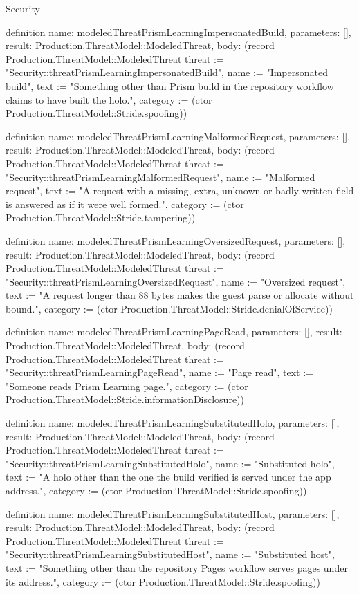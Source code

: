 \begin{lexlean}{Security}
\begin{semanticmodule}
definition{
  name: modeledThreatPrismLearningImpersonatedBuild,
  parameters: [],
  result: Production.ThreatModel::ModeledThreat,
  body: (record Production.ThreatModel::ModeledThreat {threat := "Security::threatPrismLearningImpersonatedBuild", name := "Impersonated build", text := "Something other than Prism build in the repository workflow claims to have built the holo.", category := (ctor Production.ThreatModel::Stride.spoofing)})
}

definition{
  name: modeledThreatPrismLearningMalformedRequest,
  parameters: [],
  result: Production.ThreatModel::ModeledThreat,
  body: (record Production.ThreatModel::ModeledThreat {threat := "Security::threatPrismLearningMalformedRequest", name := "Malformed request", text := "A request with a missing, extra, unknown or badly written field is answered as if it were well formed.", category := (ctor Production.ThreatModel::Stride.tampering)})
}

definition{
  name: modeledThreatPrismLearningOversizedRequest,
  parameters: [],
  result: Production.ThreatModel::ModeledThreat,
  body: (record Production.ThreatModel::ModeledThreat {threat := "Security::threatPrismLearningOversizedRequest", name := "Oversized request", text := "A request longer than 88 bytes makes the guest parse or allocate without bound.", category := (ctor Production.ThreatModel::Stride.denialOfService)})
}

definition{
  name: modeledThreatPrismLearningPageRead,
  parameters: [],
  result: Production.ThreatModel::ModeledThreat,
  body: (record Production.ThreatModel::ModeledThreat {threat := "Security::threatPrismLearningPageRead", name := "Page read", text := "Someone reads Prism Learning page.", category := (ctor Production.ThreatModel::Stride.informationDisclosure)})
}

definition{
  name: modeledThreatPrismLearningSubstitutedHolo,
  parameters: [],
  result: Production.ThreatModel::ModeledThreat,
  body: (record Production.ThreatModel::ModeledThreat {threat := "Security::threatPrismLearningSubstitutedHolo", name := "Substituted holo", text := "A holo other than the one the build verified is served under the app address.", category := (ctor Production.ThreatModel::Stride.spoofing)})
}

definition{
  name: modeledThreatPrismLearningSubstitutedHost,
  parameters: [],
  result: Production.ThreatModel::ModeledThreat,
  body: (record Production.ThreatModel::ModeledThreat {threat := "Security::threatPrismLearningSubstitutedHost", name := "Substituted host", text := "Something other than the repository Pages workflow serves pages under its address.", category := (ctor Production.ThreatModel::Stride.spoofing)})
}


\end{semanticmodule}
\end{lexlean}
